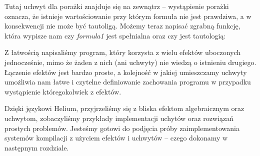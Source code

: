 Tutaj uchwyt dla porażki znajduje się na zewnątrz -- wystąpienie porażki oznacza, że istnieje wartościowanie przy którym formuła nie jest prawdziwa, a w konsekwencji nie może być tautoligą. Możemy teraz napisać zgrabną funkcję, która wypisze nam czy \textit{formula1} jest spełnialna oraz czy jest tautologią:



Z łatwością napisaliśmy program, który korzysta z wielu efektów uboczonych jednocześnie, mimo że żaden z nich (ani uchwyty) nie wiedzą o istnieniu drugiego. Łączenie efektów jest bardzo proste, a kolejność w jakiej umieszczamy uchwyty umożliwia nam łatwe i czytelne definiowanie zachowania programu w przypadku wystąpienie któregokolwiek z efektów.

Dzięki językowi Helium, przyjrzeliśmy się z bliska efektom algebraicznym oraz uchwytom, zobaczyliśmy przykłady implementacji uchytów oraz rozwiązań prostych problemów. Jesteśmy gotowi do podjęcia próby zaimplementowania systemów kompilacji z użyciem efektów i uchwytów -- czego dokonamy w następnym rozdziale.
